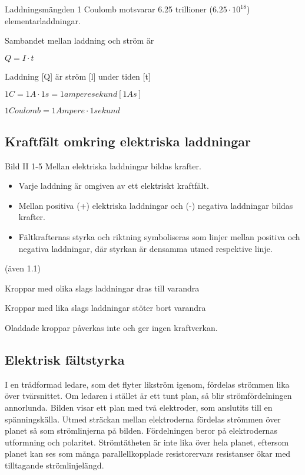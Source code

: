 Laddningsmängden 1 Coulomb motsvarar 6.25 trillioner ($6.25\cdot10^{18} $) elementarladdningar.

Sambandet mellan laddning och ström är

$Q = I \cdot t$

Laddning [Q] är ström [l] under tiden [t]

$1 C= 1 A ·1 s= 1 amperesekund [1 As]$

$1 Coulomb = 1 Ampere·1 sekund$

\subsection{Kraftfält omkring elektriska laddningar}

Bild II 1-5
Mellan elektriska laddningar bildas krafter.

\begin{itemize}
\item Varje laddning är omgiven av ett elektriskt kraftfält.
\item Mellan positiva (+) elektriska laddningar
och (-) negativa laddningar bildas krafter.
\item Fältkrafternas styrka och riktning symboliseras som linjer mellan positiva och
negativa laddningar, där styrkan är densamma utmed respektive linje.
\end{itemize}

(även 1.1)

Kroppar med olika slags laddningar dras
till varandra

Kroppar med lika slags laddningar stöter bort varandra

Oladdade kroppar påverkas inte och ger ingen kraftverkan.

\subsection{Elektrisk fältstyrka}

I en trådformad ledare, som det flyter likström igenom, fördelas strömmen lika över
tvärsnittet. Om ledaren i stället är ett tunt plan, så blir strömfördelningen annorlunda.
Bilden visar ett plan med två elektroder, som anslutits till en spänningskälla. Utmed
sträckan mellan elektroderna fördelas strömmen över planet så som strömlinjerna på bilden.
Fördelningen beror på elektrodernas utformning och polaritet. Strömtätheten är inte lika
över hela planet, eftersom planet kan ses som många parallellkopplade resistorervars
resistanser ökar med tilltagande strömlinjelängd.


